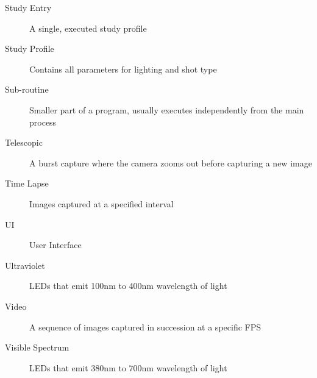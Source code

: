 \begin{description}
        \item[Study Entry] A single, executed study profile
        \item[Study Profile] Contains all parameters for lighting and shot type
	\item[Sub-routine] Smaller part of a program, usually executes independently from the main process
        \item[Telescopic] A burst capture where the camera zooms out before capturing a new image
        \item[Time Lapse] Images captured at a specified interval
	\item[UI] User Interface
        \item[Ultraviolet] LEDs that emit 100nm to 400nm wavelength of light
        \item[Video] A sequence of images captured in succession at a specific FPS
        \item[Visible Spectrum] LEDs that emit 380nm to 700nm wavelength of light
\end{description}